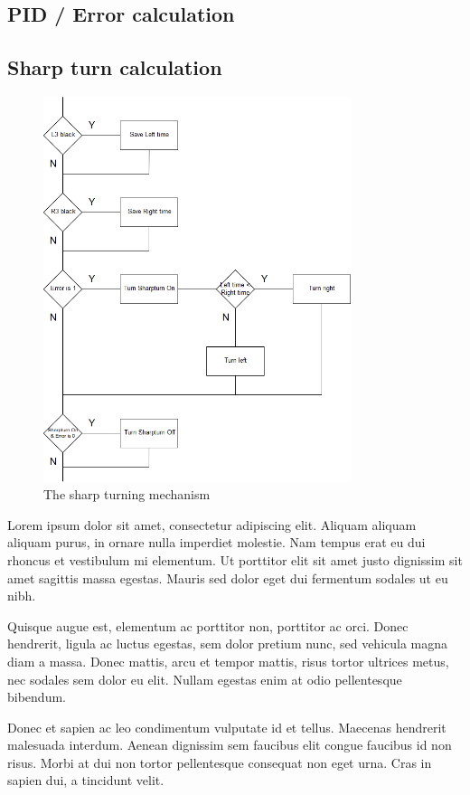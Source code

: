 \documentclass[11pt,a4paper,oneside,article]{memoir}
\begin{document}
\subsection{PID / Error calculation}

\subsection{Sharp turn calculation}

\begin{figure}[h]
	\centering
	\includegraphics[width=9cm]{illustration/Sharpturn}
	\caption{The sharp turning mechanism}
	\label{fig:Sharpturn}
\end{figure}

Lorem ipsum dolor sit amet, consectetur adipiscing elit. Aliquam aliquam aliquam purus, in ornare nulla imperdiet molestie. Nam tempus erat eu dui rhoncus et vestibulum mi elementum. Ut porttitor elit sit amet justo dignissim sit amet sagittis massa egestas. Mauris sed dolor eget dui fermentum sodales ut eu nibh. 

Quisque augue est, elementum ac porttitor non, porttitor ac orci. Donec hendrerit, ligula ac luctus egestas, sem dolor pretium nunc, sed vehicula magna diam a massa. Donec mattis, arcu et tempor mattis, risus tortor ultrices metus, nec sodales sem dolor eu elit. Nullam egestas enim at odio pellentesque bibendum. 

Donec et sapien ac leo condimentum vulputate id et tellus. Maecenas hendrerit malesuada interdum. Aenean dignissim sem faucibus elit congue faucibus id non risus. Morbi at dui non tortor pellentesque consequat non eget urna. Cras in sapien dui, a tincidunt velit.
\end{document}

